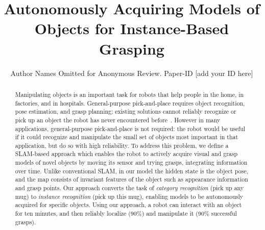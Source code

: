 \documentclass[conference]{IEEEtran}
\newcommand{\mytitle}[0]{Autonomously Acquiring Models of Objects for
  Instance-Based Grasping}
\begin{document}


\title{\mytitle{}}

\author{Author Names Omitted for Anonymous Review. Paper-ID [add your ID here]}

\maketitle


\begin{abstract}
Manipulating objects is an important task for robots that help people
in the home, in factories, and in hospitals.  General-purpose
pick-and-place requires object recognition, pose estimation, and grasp
planning; existing solutions cannot reliably recognize or pick up an
object the robot has never encountered before~\citep{}.  However in
many applications, general-purpose pick-and-place is not required: the
robot would be useful if it could recognize and manipulate the small
set of objects most important in that application, but do so with high
reliability.  To address this problem, we define a SLAM-based approach
which enables the robot to actively acquire visual and grasp models of
novel objects by moving its sensor and trying grasps, integrating
information over time.  Unlike conventional SLAM, in our model the
hidden state is the object pose, and the map consists of invariant
features of the object such as appearance information and grasp
points.  Our approach converts the task of {\em category recognition}
(pick up any mug) to {\em instance recognition} (pick up this mug),
enabling models to be autonomously acquired for specific objects.
Using our approach, a robot can interact with an object for ten
minutes, and then reliably localize (90\%) and manipulate it (90\%
successful grasps).


\end{abstract}
\end{document}
